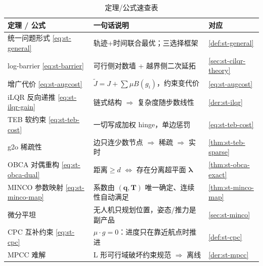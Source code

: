 \begin{table}[H]\centering\small
\caption{定理/公式速查表}
\label{tab:st-quickref}
\begin{tabular}{lll}
\toprule
定理 / 公式 & 一句话说明 & 对应 \\
\midrule
统一问题形式 \cref{eq:st-general} & 轨迹+时间联合最优；三选择框架 & \cref{def:st-general} \\
log-barrier \cref{eq:st-barrier} & 可行侧对数墙 + 越界侧二次延拓 & \cref{sec:st-cilqr-theory} \\
增广代价 \cref{eq:st-augcost} & $\tilde J=J+\sum\mu B(g_i)$，约束变代价 & \cref{eq:st-augcost} \\
iLQR 反向递推 \cref{eq:st-ilqr-gain} & 链式结构 $\Rightarrow$ 复杂度随步数线性 & \cref{der:st-ilqr} \\
TEB 软约束 \cref{eq:st-teb-cost} & 一切写成加权 hinge，单边惩罚 & \cref{eq:st-teb-cost} \\
g2o 稀疏性 & 边只连少数节点 $\Rightarrow$ 稀疏 $\Rightarrow$ 实时 & \cref{thm:st-teb-sparse} \\
OBCA 对偶重构 \cref{eq:st-obca-dual} & 距离$\ge d$ $\Leftrightarrow$ 存在分离超平面 $\boldsymbol\lambda$ & \cref{thm:st-obca-exact} \\
MINCO 参数映射 \cref{eq:st-minco-map} & 系数由 $(\mathbf q,\mathbf T)$ 唯一确定、连续性自动满足 & \cref{thm:st-minco-map} \\
微分平坦 & 无人机只规划位置，姿态/推力是副产品 & \cref{sec:st-minco} \\
CPC 互补约束 \cref{eq:st-cpc} & $\mu\cdot g=0$：进度只在靠近航点时推进 & \cref{def:st-cpc} \\
MPCC 难解 & L 形可行域破坏约束规范 $\Rightarrow$ 离线 & \cref{der:st-mpcc} \\
\bottomrule
\end{tabular}
\end{table}

